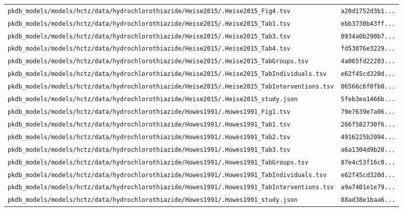 \documentclass{article}
\begin{document}
\begin{longtable}{ll}
\texttt{pkdb\_models/models/hctz/data/hydrochlorothiazide/Heise2015/.Heise2015\_Fig4.tsv} & \texttt{a20d1752d3b1...} \\
\texttt{pkdb\_models/models/hctz/data/hydrochlorothiazide/Heise2015/.Heise2015\_Tab1.tsv} & \texttt{ebb3730b43ff...} \\
\texttt{pkdb\_models/models/hctz/data/hydrochlorothiazide/Heise2015/.Heise2015\_Tab3.tsv} & \texttt{0934a0b290b7...} \\
\texttt{pkdb\_models/models/hctz/data/hydrochlorothiazide/Heise2015/.Heise2015\_Tab4.tsv} & \texttt{fd53076e3229...} \\
\texttt{pkdb\_models/models/hctz/data/hydrochlorothiazide/Heise2015/.Heise2015\_TabGroups.tsv} & \texttt{4a065fd22203...} \\
\texttt{pkdb\_models/models/hctz/data/hydrochlorothiazide/Heise2015/.Heise2015\_TabIndividuals.tsv} & \texttt{e62f45cd320d...} \\
\texttt{pkdb\_models/models/hctz/data/hydrochlorothiazide/Heise2015/.Heise2015\_TabInterventions.tsv} & \texttt{06566c6f0fb0...} \\
\texttt{pkdb\_models/models/hctz/data/hydrochlorothiazide/Heise2015/.Heise2015\_study.json} & \texttt{5feb3ea1466b...} \\
\texttt{pkdb\_models/models/hctz/data/hydrochlorothiazide/Howes1991/.Howes1991\_Fig1.tsv} & \texttt{79e7639e7a06...} \\
\texttt{pkdb\_models/models/hctz/data/hydrochlorothiazide/Howes1991/.Howes1991\_Tab1.tsv} & \texttt{266f582730f6...} \\
\texttt{pkdb\_models/models/hctz/data/hydrochlorothiazide/Howes1991/.Howes1991\_Tab2.tsv} & \texttt{4916225b2094...} \\
\texttt{pkdb\_models/models/hctz/data/hydrochlorothiazide/Howes1991/.Howes1991\_Tab3.tsv} & \texttt{a6a1304d9b20...} \\
\texttt{pkdb\_models/models/hctz/data/hydrochlorothiazide/Howes1991/.Howes1991\_TabGroups.tsv} & \texttt{87e4c53f16c0...} \\
\texttt{pkdb\_models/models/hctz/data/hydrochlorothiazide/Howes1991/.Howes1991\_TabIndividuals.tsv} & \texttt{e62f45cd320d...} \\
\texttt{pkdb\_models/models/hctz/data/hydrochlorothiazide/Howes1991/.Howes1991\_TabInterventions.tsv} & \texttt{a9a7401e1e79...} \\
\texttt{pkdb\_models/models/hctz/data/hydrochlorothiazide/Howes1991/.Howes1991\_study.json} & \texttt{88ad38e1baa6...} \\

\end{longtable}
\end{document}
